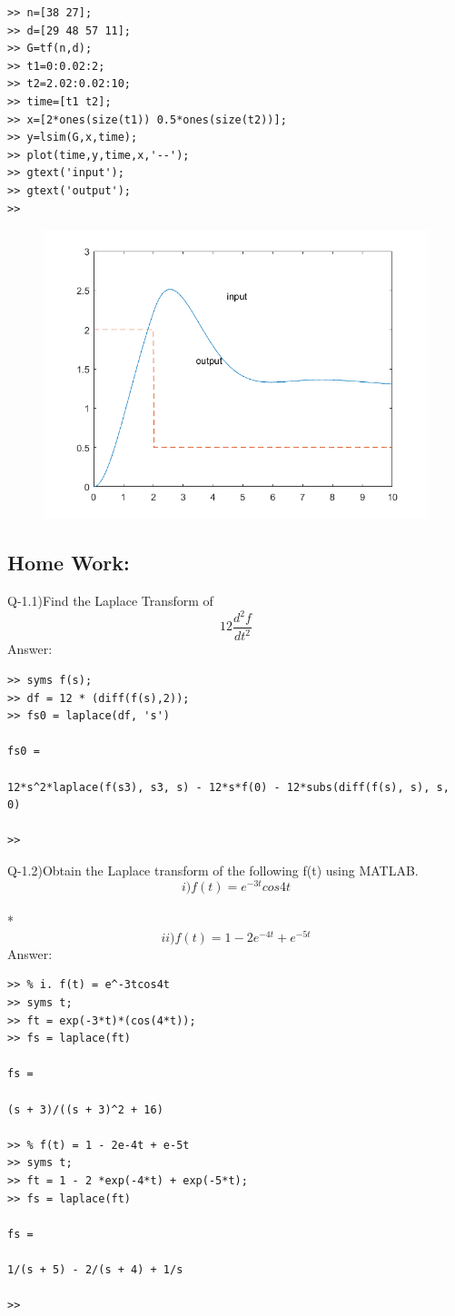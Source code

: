 \documentclass[conference]{IEEEtran}
\begin{document}
\begin{verbatim}
>> n=[38 27];
>> d=[29 48 57 11];
>> G=tf(n,d);
>> t1=0:0.02:2;
>> t2=2.02:0.02:10;
>> time=[t1 t2];
>> x=[2*ones(size(t1)) 0.5*ones(size(t2))];
>> y=lsim(G,x,time);
>> plot(time,y,time,x,'--');
>> gtext('input');
>> gtext('output');
>> 
\end{verbatim}
\begin{figure}[h!]
  \includegraphics[width=\linewidth]{output.png}
  \label{fig:fig1}
\end{figure}

\subsection{Home Work:}
Q-1.1)Find the Laplace Transform of 
\[12\frac{d^2f}{dt^2}\]
Answer:
\begin{verbatim}
>> syms f(s);
>> df = 12 * (diff(f(s),2));
>> fs0 = laplace(df, 's')
 
fs0 =
 
12*s^2*laplace(f(s3), s3, s) - 12*s*f(0) - 12*subs(diff(f(s), s), s, 0)
 
>> 
\end{verbatim}
Q-1.2)Obtain the Laplace transform of the 
following f(t) using MATLAB.
$$ i)f(t) = e^{-3t} cos4t $$\\*
$$ii)f(t) = 1 - 2e^{-4t} + e^{-5t} $$
\hspace{5em}
Answer:
\begin{verbatim}
>> % i. f(t) = e^-3tcos4t
>> syms t;
>> ft = exp(-3*t)*(cos(4*t));
>> fs = laplace(ft)
 
fs =
 
(s + 3)/((s + 3)^2 + 16)
 
>> % f(t) = 1 - 2e-4t + e-5t
>> syms t;
>> ft = 1 - 2 *exp(-4*t) + exp(-5*t);
>> fs = laplace(ft)
 
fs =
 
1/(s + 5) - 2/(s + 4) + 1/s
 
>> 
\end{verbatim}
\end{document}
